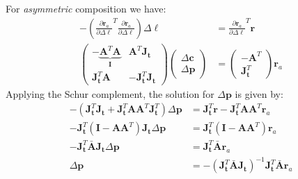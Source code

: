 For \emph{asymmetric} composition we have:
\begin{equation}
    \begin{aligned}
    	-\left( \frac{\partial \mathbf{r}_a}{\partial \Delta \boldsymbol{\ell}}^T \frac{\partial \mathbf{r}_a}{\partial \Delta \boldsymbol{\ell}} \right) \Delta \boldsymbol{\ell} & = \frac{\partial \mathbf{r}_a}{\partial \Delta \boldsymbol{\ell}}^T \mathbf{r}
    	\\
        \begin{pmatrix}
            -\underbrace{\mathbf{A}^T \mathbf{A}}_{\mathbf{I}} & \mathbf{A}^T \mathbf{J}_{\mathbf{t}}
            \\
            \mathbf{J}_\mathbf{t}^T \mathbf{A} & -\mathbf{J}_{\mathbf{t}}^T \mathbf{J}_{\mathbf{t}}
        \end{pmatrix}
        \begin{pmatrix}
            \Delta\mathbf{c}
            \\
            \Delta\mathbf{p}
        \end{pmatrix}
        & =
        \begin{pmatrix}
            -\mathbf{A}^T
            \\
            \mathbf{J}_{\mathbf{t}}^T
        \end{pmatrix} \mathbf{r}_a
    \label{eq:asymmetric_structure}
    \end{aligned}
\end{equation}
Applying the Schur complement, the solution for $\Delta\mathbf{p}$ is given by:
\begin{equation}
    \begin{aligned}
        -(\mathbf{J}_{\mathbf{t}}^T\mathbf{J}_{\mathbf{t}} + \mathbf{J}_{\mathbf{t}}^T\mathbf{A}\mathbf{A}^T\mathbf{J}_{\mathbf{t}}^T) \Delta \mathbf{p} & = \mathbf{J}_{\mathbf{t}}^T\mathbf{r} - \mathbf{J}_{\mathbf{t}}^T\mathbf{A} \mathbf{A}^T \mathbf{r}_a
        \\
        -\mathbf{J}_{\mathbf{t}}^T(\mathbf{I} - \mathbf{A} \mathbf{A}^T)\mathbf{J}_{\mathbf{t}} \Delta \mathbf{p} & = \mathbf{J}_{\mathbf{t}}^T(\mathbf{I} - \mathbf{A} \mathbf{A}^T)\mathbf{r}_a
        \\
        -\mathbf{J}_{\mathbf{t}}^T\bar{\mathbf{A}}\mathbf{J}_{\mathbf{t}} \Delta \mathbf{p} & = \mathbf{J}_{\mathbf{t}}^T\bar{\mathbf{A}}\mathbf{r}_a
        \\
        \Delta \mathbf{p} & = -\left( \mathbf{J}_{\mathbf{t}}^T\bar{\mathbf{A}}\mathbf{J}_{\mathbf{t}} \right)^{-1} \mathbf{J}_{\mathbf{t}}^T\bar{\mathbf{A}}\mathbf{r}_a
    \label{eq:asymmetric_schur_solution1}
    \end{aligned}
\end{equation}
